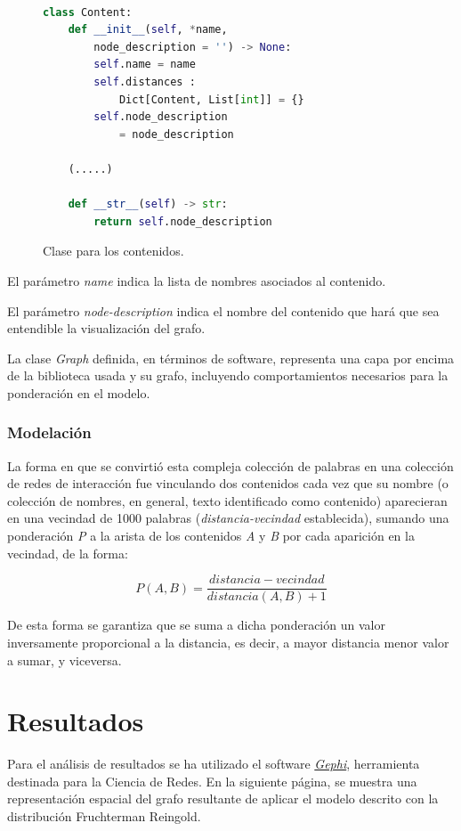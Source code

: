 \documentclass[a4paper,10pt,twocolumn]{article}
\begin{document}
        
    \begin{figure}[htb]%
			\begin{lstlisting}[language=python]%

class Content:
    def __init__(self, *name, 
        node_description = '') -> None:
        self.name = name
        self.distances : 
            Dict[Content, List[int]] = {}
        self.node_description 
            = node_description
        
    (.....)
    
    def __str__(self) -> str:
        return self.node_description
			\end{lstlisting}
		\caption{Clase para los contenidos.\label{fig:code}}
		\end{figure}
        
        
        El parámetro \emph{name} indica la lista de nombres asociados al contenido.

        El parámetro \emph{node-description} indica el nombre del contenido que hará que sea entendible la visualización del grafo.

        La clase \emph{Graph} definida, en términos de software, representa una capa por encima de la biblioteca usada y su grafo, incluyendo comportamientos necesarios para la ponderación en el modelo.

        \subsubsection{Modelación}

        La forma en que se convirtió esta compleja colección de palabras en una colección de redes de interacción fue vinculando dos contenidos cada vez que su nombre (o colección de nombres, en general, texto identificado como contenido) aparecieran en una vecindad de 1000 palabras (\emph{distancia-vecindad} establecida), sumando una ponderación \emph{P} a la arista de los contenidos \emph{A} y \emph{B} por cada aparición en la vecindad, de la forma:


        $$ P(A, B) = \frac{distancia-vecindad}{distancia(A, B) + 1}$$


        De esta forma se garantiza que se suma a dicha ponderación un valor inversamente proporcional a la distancia, es decir, a mayor distancia menor valor a sumar, y viceversa. 

        \section{Resultados}
        Para el análisis de resultados se ha utilizado el software \href{https://gephi.org}{\emph{Gephi}}, herramienta destinada para la Ciencia de Redes.
        \newpage
        En la siguiente página, se muestra una representación espacial del grafo resultante de aplicar el modelo descrito con la distribución Fruchterman Reingold.
\end{document}

